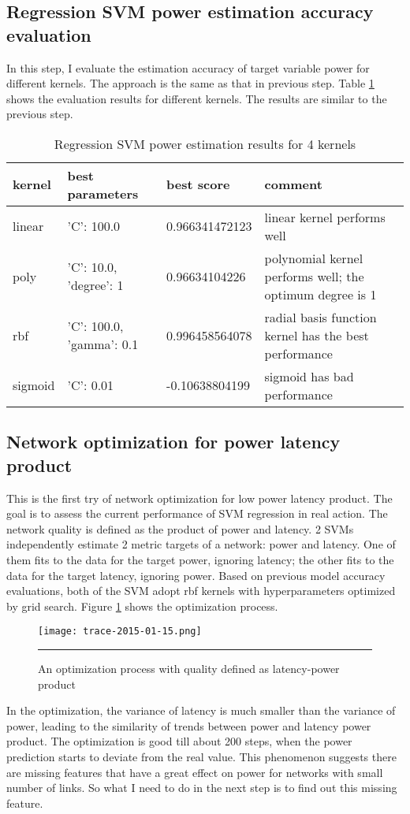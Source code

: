 \documentclass[12pt]{article}
\theoremstyle{definition}
\begin{document}
\subsection{Regression SVM power estimation accuracy evaluation}
In this step, I evaluate the estimation accuracy of target variable power for different kernels. The approach is the same as that in previous step. Table \ref{tab:power} shows the evaluation results for different kernels. The results are similar to the previous step.
\begin{table}[htb]
  \centering
  \begin{tabularx}{\textwidth}{|l|l|l|X|} \hline
    kernel & best parameters & best score & comment \\ \hline
    linear & {'C': 100.0} & 0.966341472123 & linear kernel performs well \\ \hline
    poly & {'C': 10.0, 'degree': 1} & 0.96634104226 & polynomial kernel performs well; the optimum degree is 1 \\ \hline
    rbf & {'C': 100.0, 'gamma': 0.1} & 0.996458564078 & radial basis function kernel has the best performance \\ \hline
    sigmoid & {'C': 0.01} & -0.10638804199 & sigmoid has bad performance \\ \hline
  \end{tabularx}
  \caption{Regression SVM power estimation results for 4 kernels}
  \label{tab:power}
\end{table}
\subsection{Network optimization for power latency product}
This is the first try of network optimization for low power latency product. The goal is to assess the current performance of SVM regression in real action. The network quality is defined as the product of power and latency. 2 SVMs independently estimate 2 metric targets of a network: power and latency. One of them fits to the data for the target power, ignoring latency; the other fits to the data for the target latency, ignoring power. Based on previous model accuracy evaluations, both of the SVM adopt rbf kernels with hyperparameters optimized by grid search. Figure \ref{fig:latency-power} shows the optimization process.
\begin{figure}[htb]
  \centering
      {\texttt{[image: trace-2015-01-15.png]}}
      \rule{\linewidth}{1pt}
      \caption{An optimization process with quality defined as latency-power product}
      \label{fig:latency-power}
\end{figure}
In the optimization, the variance of latency is much smaller than the variance of power, leading to the similarity of trends between power and latency power product. The optimization is good till about 200 steps, when the power prediction starts to deviate from the real value. This phenomenon suggests there are missing features that have a great effect on power for networks with small number of links. So what I need to do in the next step is to find out this missing feature.
\end{document}
